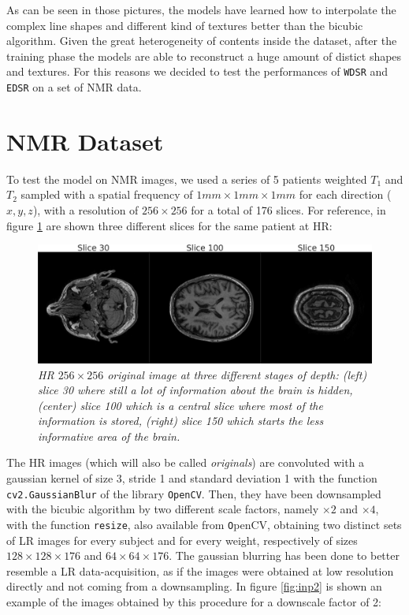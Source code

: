 \documentclass[12pt,a4paper]{report}
\begin{document}
As can be seen in those pictures, the models have learned how to interpolate the complex line shapes and different kind of textures better than the bicubic algorithm.
Given the great heterogeneity of contents inside the dataset, after the training phase the models are able to reconstruct a huge amount of distict shapes and textures. For this reasons we decided to test the performances of {\tt WDSR} and {\tt EDSR} on a set of NMR data. 

\section{NMR Dataset}

To test the model on NMR images, we used a series of 5 patients weighted $T_1$ and $T_2$ sampled with a spatial frequency of $1mm \times 1mm \times 1mm$ for each direction ($x, y, z$), with a resolution of $256 \times 256$ for a total of 176 slices. For reference, in figure \ref{fig:orig_ref} are shown three different slices for the same patient at HR:

\begin{figure}[H]
 \centering
 \includegraphics[scale=0.31]{./images/orig_slice_comp.png}
 \caption{\it HR $256 \times 256$ original image at three different stages of depth: (left) slice 30 where still a lot of information about the brain is hidden, (center) slice 100 which is a central slice where most of the information is stored, (right) slice 150 which starts the less informative area of the brain.}
 \label{fig:orig_ref}
\end{figure}

The HR images (which will also be called {\it originals}) are convoluted with a gaussian kernel of size 3, stride 1 and standard deviation 1 with the function \texttt{cv2.GaussianBlur} of the library \texttt{OpenCV}. 
Then, they have been  downsampled with the bicubic algorithm by two different scale factors, namely $\times 2$ and $\times 4$, with the function \texttt{resize}, also available from {\texttt OpenCV}, obtaining two distinct sets of LR images for every subject and for every weight, respectively of sizes $128 \times 128 \times 176$ and $64 \times 64 \times 176$.
The gaussian blurring has been done to better resemble a LR data-acquisition, as if the images were obtained at low resolution directly and not coming from a downsampling.
In figure \ref{fig:inp2} is shown an example of the images obtained by this procedure for a downscale factor of 2:
\end{document}
